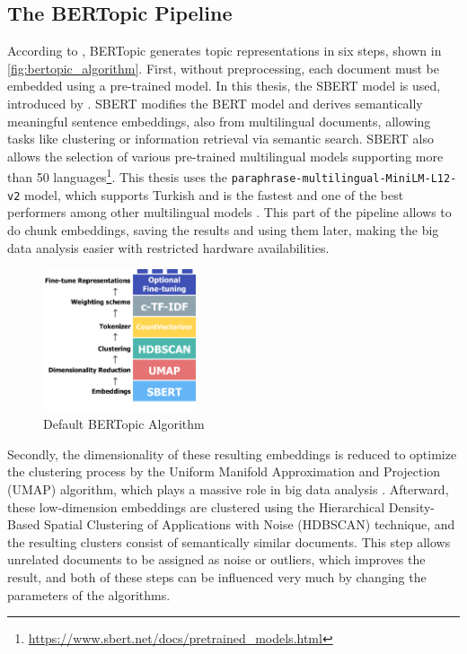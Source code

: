 \subsection{The BERTopic Pipeline}

According to \textcite{bertopic}, BERTopic generates topic representations in six steps,
shown in \autoref{fig:bertopic_algorithm}. 
First, without preprocessing, each document must be embedded using a pre-trained model. 
In this thesis, the SBERT model is used, introduced by \textcite{sentence-bert}. 
SBERT modifies the BERT model and derives semantically meaningful sentence embeddings, 
also from multilingual documents, allowing tasks like clustering or information retrieval 
via semantic search. SBERT also allows the selection of various pre-trained multilingual 
models supporting more than 50 languages\footnote{\url{https://www.sbert.net/docs/pretrained_models.html}}. 
This thesis uses the \texttt{paraphrase-multilingual-MiniLM-L12-v2} model, which supports 
Turkish and is the fastest and one of the best performers among other multilingual models 
\parencite{reimers_sbert_multilingual_2020}. This part of the pipeline allows to do 
chunk embeddings, saving the results and using them later, making the big data analysis 
easier with restricted hardware availabilities.

\begin{figure}
    \centering
    \includegraphics[width=0.4\textwidth]{figures/bertopic_algorithm.png}
    \caption[Default BERTopic Algorithm]
    {Default BERTopic Algorithm\footnotemark}\label{fig:bertopic_algorithm}
\end{figure}

Secondly, the dimensionality of these resulting embeddings is reduced to optimize the 
clustering process by the Uniform Manifold Approximation and Projection (UMAP) algorithm, 
which plays a massive role in big data analysis \parencite{mcinnes_umap_2020}. 
Afterward, these low-dimension embeddings are clustered using the Hierarchical Density-Based 
Spatial Clustering of Applications with Noise (HDBSCAN) technique, and the resulting 
clusters consist of semantically similar documents. This step allows unrelated documents 
to be assigned as noise or outliers, which improves the result, and both of these 
steps can be influenced very much by changing the parameters of the algorithms.

